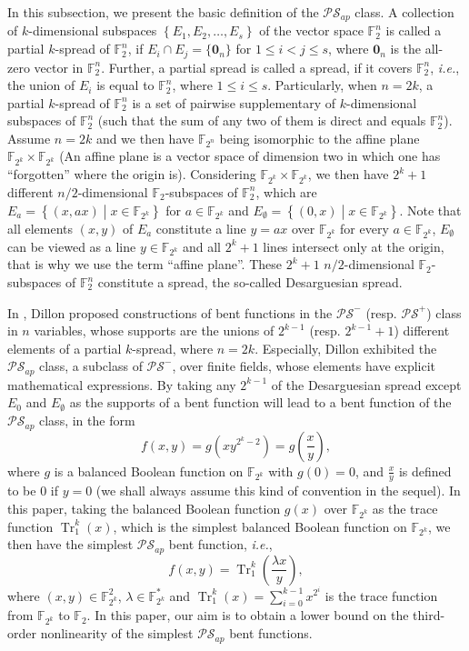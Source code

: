 \documentclass{article}
\newcommand{\F}{\mathbb{F}}
\newcommand{\0}{\textbf{0}}
\newcommand{\1}{\textbf{1}}
\newcommand{\TRACE}{\operatorname{Tr}_1^k}
\theoremstyle{plain}
\begin{document}
In this subsection, we present the basic definition of the $\mathcal{PS}_{ap}$ class.
A collection of $k$-dimensional subspaces $\left\{ E_1,E_2,\dots,E_s \right\}$ of the vector space $\F_2^n$ is called a partial $k$-spread of $\F_2^n$,
if $E_i\cap E_j = \{\bm{0}_n\}$ for $1\le i<j\le s$, where $\bm{0}_n$ is the all-zero vector in $\F_2^n$.
Further, a partial spread is called a spread, if it covers $\F_2^n$, \emph{i.e.}, the union of $E_i$ is equal to $\F_2^n$, where $1\le i\le s$.
Particularly, when $n=2k$, a partial $k$-spread of $\F_2^n$ is a set of pairwise supplementary of $k$-dimensional subspaces of $\F_2^n$ (such that the sum of any two of them is direct and equals $\F_2^n$).
Assume $n=2k$ and we then have $\F_{2^n}$ being isomorphic to the affine plane $\F_{2^k}\times\F_{2^k}$ (An affine plane is a vector space of dimension two in which one has ``forgotten'' where the origin is).
Considering $\F_{2^k}\times\F_{2^k}$, we then have $2^k+1$ different $n/2$-dimensional $\F_2$-subspaces of $\F_2^n$, which are $E_a=\left\{(x,ax)\middle| x\in\F_{2^k}\right\}$ for $a\in\F_{2^k}$ and $E_{\emptyset}=\left\{(0,x)\middle| x\in\F_{2^k}\right\}$.
Note that all elements $(x,y)$ of $E_a$ constitute a line $y=ax$ over $\F_{2^k}$ for every $a\in\F_{2^k}$, $E_{\emptyset}$ can be viewed as a line $y\in\F_{2^k}$ and all $2^k+1$ lines intersect only at the origin, that is why we use the term ``affine plane''.
These $2^k+1$ $n/2$-dimensional $\F_2$-subspaces of $\F_2^n$ constitute a spread, the so-called Desarguesian spread.

In \cite{Dillon1974PSbent}, Dillon proposed constructions of bent functions in the $\mathcal{PS}^-$ (resp. $\mathcal{PS}^+$) class in $n$ variables, whose supports are the unions of $2^{k-1}$ (resp. $2^{k-1}+1$) different elements of a partial $k$-spread, where $n=2k$.
Especially, Dillon exhibited the $\mathcal{PS}_{ap}$ class, a subclass of $\mathcal{PS}^-$, over finite fields, whose elements have explicit mathematical expressions.
By taking any $2^{k-1}$ of the Desarguesian spread except $E_0$ and $E_{\emptyset}$ as the supports of a bent function will lead to a bent function of the $\mathcal{PS}_{ap}$ class, in the form
    \begin{equation*}\label{Eqn_PS_bent}
        f(x,y)=g\left(xy^{2^k-2}\right)=g\left(\frac{x}{y}\right),
    \end{equation*}
    where $g$ is a balanced Boolean function on $\F_{2^{k}}$ with $g(0)=0$, and $\frac{x}{y}$ is defined to be $0$ if $y=0$ (we shall always assume this kind of convention in the sequel).
    In this paper, taking the balanced Boolean function $g(x)$ over $\F_{2^k}$ as the trace function $\TRACE(x)$, which is the simplest balanced Boolean function on $\F_{2^k}$, we then have the simplest
    $\mathcal{PS}_{ap}$ bent function, \emph{i.e.},
    \begin{equation*}\label{sub-bent}
        f(x,y)=\TRACE\left(\frac{\lambda x}{y}\right),
    \end{equation*}
    where $(x,y)\in\F_{2^k}^2$, $\lambda\in\F_{2^k}^{*}$ and $\TRACE(x)=\sum\limits_{i=0}^{k-1}x^{2^i}$ is the trace function from $\F_{2^k}$ to $\F_2$.
    In this paper, our aim is to obtain a lower bound on the third-order nonlinearity of the simplest $\mathcal{PS}_{ap}$ bent functions.
\end{document}
